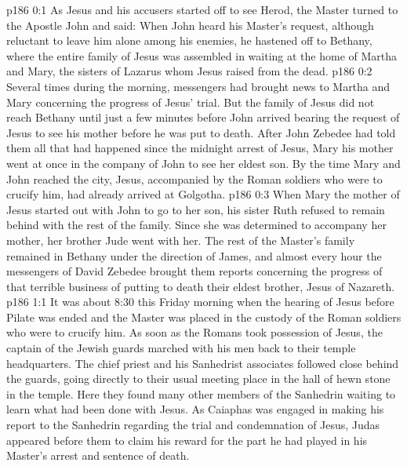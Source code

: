 \author{Midwayer Commission}
\vs p186 0:1 As Jesus and his accusers started off to see Herod, the Master turned to the Apostle John and said:  When John heard his Master’s request, although reluctant to leave him alone among his enemies, he hastened off to Bethany, where the entire family of Jesus was assembled in waiting at the home of Martha and Mary, the sisters of Lazarus whom Jesus raised from the dead.
\vs p186 0:2 Several times during the morning, messengers had brought news to Martha and Mary concerning the progress of Jesus’ trial. But the family of Jesus did not reach Bethany until just a few minutes before John arrived bearing the request of Jesus to see his mother before he was put to death. After John Zebedee had told them all that had happened since the midnight arrest of Jesus, Mary his mother went at once in the company of John to see her eldest son. By the time Mary and John reached the city, Jesus, accompanied by the Roman soldiers who were to crucify him, had already arrived at Golgotha.
\vs p186 0:3 When Mary the mother of Jesus started out with John to go to her son, his sister Ruth refused to remain behind with the rest of the family. Since she was determined to accompany her mother, her brother Jude went with her. The rest of the Master’s family remained in Bethany under the direction of James, and almost every hour the messengers of David Zebedee brought them reports concerning the progress of that terrible business of putting to death their eldest brother, Jesus of Nazareth.
\vs p186 1:1 It was about 8:30 this Friday morning when the hearing of Jesus before Pilate was ended and the Master was placed in the custody of the Roman soldiers who were to crucify him. As soon as the Romans took possession of Jesus, the captain of the Jewish guards marched with his men back to their temple headquarters. The chief priest and his Sanhedrist associates followed close behind the guards, going directly to their usual meeting place in the hall of hewn stone in the temple. Here they found many other members of the Sanhedrin waiting to learn what had been done with Jesus. As Caiaphas was engaged in making his report to the Sanhedrin regarding the trial and condemnation of Jesus, Judas appeared before them to claim his reward for the part he had played in his Master’s arrest and sentence of death.
